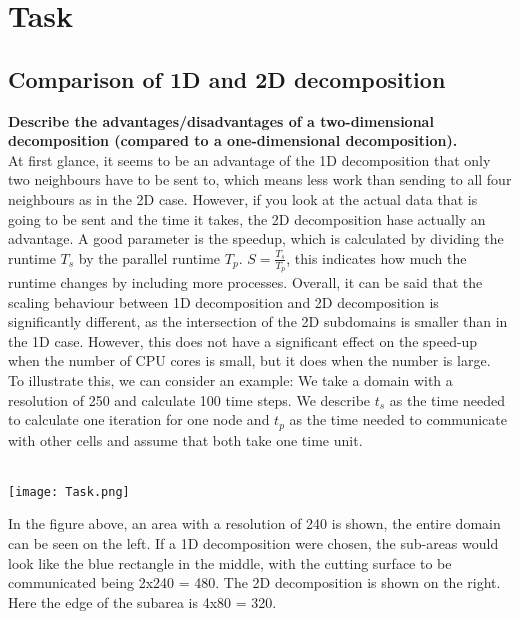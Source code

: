 \documentclass[10pt,a4paper]{article}
\begin{document}
\section{Task}

\subsection{Comparison of 1D and 2D decomposition}

\textbf{Describe the advantages/disadvantages of a two-dimensional decomposition (compared to a one-dimensional decomposition).}\\

At first glance, it seems to be an advantage of the 1D decomposition that only two neighbours have to be sent to, which 
means less work than sending to all four neighbours as in the 2D case. However, if you look at the actual data that is going 
to be sent and the time it takes, the 2D decomposition hase actually an advantage. A good parameter is the speedup, 
which is calculated by dividing the runtime $T_s$ by the parallel runtime $T_p$. $S = \frac{T_s}{T_p}$, this indicates 
how much the runtime changes by including more processes. Overall, it can be said that the scaling behaviour 
between 1D decomposition and 2D decomposition is significantly different, as the intersection of the 2D subdomains is 
smaller than in the 1D case. However, this does not have a significant effect on the speed-up when the number of CPU 
cores is small, but it does when the number is large. \\


To illustrate this, we can consider an example: We take a domain with a resolution of 250 and calculate 100 time steps. 
We describe $t_s$ as the time needed to calculate one iteration for one node and $t_p$ as the time needed to communicate 
with other cells and assume that both take one time unit. \\
\\
\begin{center}
\texttt{[image: Task.png]}
\end{center}

In the figure above, an area with a resolution of 240 is shown, the entire domain can be seen on the left. If a 1D 
decomposition were chosen, the sub-areas would look like the blue rectangle in the middle, with the cutting surface 
to be communicated being 2x240 = 480. The 2D decomposition is shown on the right. Here the edge of the subarea is 
4x80 = 320. \\
\end{document}
